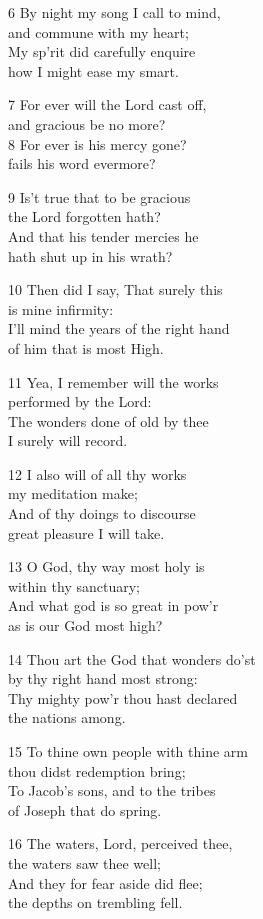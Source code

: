 6 By night my song I call to mind,\\
and commune with my heart;\\
My sp’rit did carefully enquire\\
how I might ease my smart.

7 For ever will the Lord cast off,\\
and gracious be no more?\\
8 For ever is his mercy gone?\\
fails his word evermore?

9 Is’t true that to be gracious\\
the Lord forgotten hath?\\
And that his tender mercies he\\
hath shut up in his wrath?

10 Then did I say, That surely this\\
is mine infirmity:\\
I’ll mind the years of the right hand\\
of him that is most High.

11 Yea, I remember will the works\\
performed by the Lord:\\
The wonders done of old by thee\\
I surely will record.

12 I also will of all thy works\\
my meditation make;\\
And of thy doings to discourse\\
great pleasure I will take.

13 O God, thy way most holy is\\
within thy sanctuary;\\
And what god is so great in pow’r\\
as is our God most high?

14 Thou art the God that wonders do’st\\
by thy right hand most strong:\\
Thy mighty pow’r thou hast declared\\
the nations among.

15 To thine own people with thine arm\\
thou didst redemption bring;\\
To Jacob’s sons, and to the tribes\\
of Joseph that do spring.

16 The waters, Lord, perceived thee,\\
the waters saw thee well;\\
And they for fear aside did flee;\\
the depths on trembling fell.

